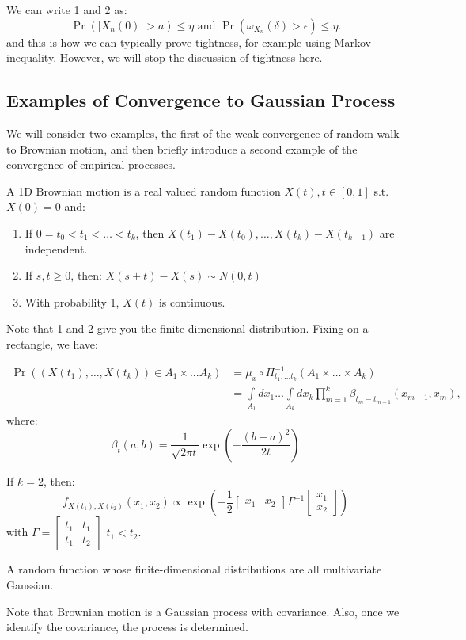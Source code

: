 \documentclass[../main/main.tex]{subfiles}
\begin{document}
We can write 1 and 2 as: \[
	\Pr(|X_n(0) | > a) \leq \eta \text{ and } \Pr(\omega_{X_n}(\delta)> \epsilon ) \leq \eta.
\] and this is how we can typically prove tightness, for example using Markov inequality. However, we will stop the discussion of tightness here.

\subsection{Examples of Convergence to Gaussian Process}
We will consider two examples, the first of the weak convergence of random walk to Brownian motion, and then briefly introduce a second example of the convergence of empirical processes.

\begin{definition} A 1D Brownian motion is a real valued random function $ X(t), t \in[0,1] $ s.t. $X(0) = 0$ and: \begin{enumerate}
		\item If $0 = t_0 < t_1 < \ldots < t_k$, then $X(t_1) - X(t_0) ,\ldots, X(t_k) - X(t_{k-1}) $ are independent.
		\item If $s, t \geq 0$, then: $ X(s+t) - X(s) \sim N(0, t) $
		\item With probability 1, $X(t)$ is continuous.
	\end{enumerate}
\end{definition}

Note that 1 and 2 give you the finite-dimensional distribution. Fixing on a rectangle, we have:

\begin{align*}
	\Pr((X(t_1) ,\ldots , X(t_k) ) \in A_1 \times ... A_k) & =
	\mu_x \circ \Pi_{t_1, \ldots t_k}^{-1} (A_1 \times \ldots \times A_k) \\ &= \int\limits_{A_1} dx_1 \ldots \int\limits_{A_k} d x_k \prod\limits_{m=1}^{k} \beta_{t_{m}- t_{m-1}} (x_{m-1}, x_m),
\end{align*} where: \[
	\beta_t(a, b) = \frac{1}{\sqrt{2 \pi t}} \exp \left( - \frac{(b-a)^2}{2t} \right)
\]
\begin{example}
	If $k = 2$, then: \[
		f_{X(t_1), X(t_2)}(x_1, x_2) \propto \exp \left( - \frac{1}{2} \begin{bmatrix}
			x_1 & x_2
		\end{bmatrix} \Gamma^{-1} \begin{bmatrix}
			x_1 \\ x_2
		\end{bmatrix} \right)
	\] with $\Gamma = \begin{bmatrix}
			t_1 & t_1 \\ t_1 & t_2
		\end{bmatrix}$ $ t_1 < t_2$.
\end{example}
\begin{definition} A random function whose finite-dimensional distributions are all multivariate Gaussian.
\end{definition}
Note that Brownian motion is a Gaussian process with covariance. Also, once we identify the covariance, the process is determined.
\end{document}
